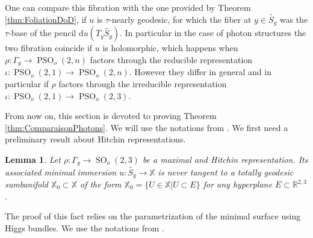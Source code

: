 \documentclass[reqno,10pt]{amsart}
\theoremstyle{plain}
\newtheorem{lem}[thm]{Lemma}
\theoremstyle{definition}
\theoremstyle{remark}
\newcommand{\type}{\tau}
\newcommand{\R}{\mathbb{R}}
\DeclareMathOperator{\PSO}{PSO}
\DeclareMathOperator{\SO}{SO}
\newcommand{\X}{\mathbb{X}}
\begin{document}
One can compare this fibration with the one provided by Theorem \ref{thm:FoliationDoD}, if $u$ is $\type$-nearly geodesic, for which the fiber at $y\in \widetilde{S_g}$ was the $\type$-base of the pencil $\mathrm{d}u(T_y\widetilde{S_g})$. In particular in the case of photon structures the two fibration coincide if $u$ is holomorphic, which happens when $\rho:\Gamma_g\to\PSO_o(2,n)$ factors through the reducible representation $\iota:\PSO_o(2,1)\to \PSO_o(2,n)$. However they differ in general and in particular if $\rho$ factors through the irreducible representation $\iota:\PSO_o(2,1)\to \PSO_o(2,3)$.

\medskip

From now on, this section is devoted to proving Theorem \ref{thm:ComparaisonPhotons}. We will use the notations from \cite[{Section 3.3}]{Collier_2019}. We first need a preliminary result about Hitchin representations.

\begin{lem}
\label{lem:ApeendixHitchinMax}
Let $\rho:\Gamma_g\to \SO_o(2,3)$ be a maximal and Hitchin representation. Its associated minimal immersion $u:\widetilde{S_g}\to \X$ is never tangent to a totally geodesic sumbanifold $\X_0\subset \X$ of the form $\X_0=\lbrace U\in \X|U\subset E\rbrace$ for any hyperplane $E\subset \R^{2,3}$.
\end{lem}

The proof of this fact relies on the parametrization of the minimal surface using Higgs bundles. We use the notations from \cite[Section 4.3]{Collier_2019}.

\medskip
\end{document}
